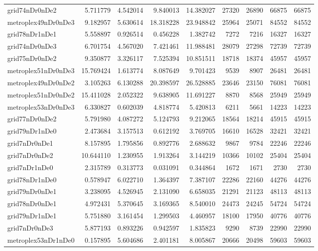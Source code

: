 \begin{longtable}{|l|r|r|r|r|r|r|r|r|}
grid74nDr0nDe2 & 5.711779 & 4.542014 & 9.840013 & 14.382027 & 27320 & 26890 & 66875 & 66875 \\
metroplex49nDr0nDe3 & 9.182957 & 5.630614 & 18.318228 & 23.948842 & 25964 & 25071 & 84552 & 84552 \\
grid78nDr1nDe1 & 5.558897 & 0.926514 & 0.456228 & 1.382742 & 7272 & 7216 & 16327 & 16327 \\
grid74nDr0nDe3 & 6.701754 & 4.567020 & 7.421461 & 11.988481 & 28079 & 27298 & 72739 & 72739 \\
grid75nDr0nDe2 & 9.350877 & 3.326117 & 7.525394 & 10.851511 & 18718 & 18374 & 45957 & 45957 \\
metroplex51nDr0nDe3 & 15.769424 & 1.613774 & 8.087649 & 9.701423 & 9539 & 8907 & 26481 & 26481 \\
metroplex49nDr0nDe2 & 3.105263 & 6.130288 & 20.398597 & 26.528885 & 23646 & 23150 & 76081 & 76081 \\
metroplex51nDr0nDe2 & 15.411028 & 2.052322 & 9.638905 & 11.691227 & 8870 & 8568 & 25949 & 25949 \\
metroplex53nDr0nDe3 & 6.330827 & 0.602039 & 4.818774 & 5.420813 & 6211 & 5661 & 14223 & 14223 \\
grid77nDr0nDe2 & 5.791980 & 4.087272 & 5.124793 & 9.212065 & 18564 & 18214 & 45915 & 45915 \\
grid79nDr1nDe0 & 2.473684 & 3.157513 & 0.612192 & 3.769705 & 16610 & 16528 & 32421 & 32421 \\
grid7nDr0nDe1 & 8.157895 & 1.795856 & 0.892776 & 2.688632 & 9867 & 9784 & 22246 & 22246 \\
grid7nDr0nDe2 & 10.644110 & 1.230955 & 1.913264 & 3.144219 & 10366 & 10102 & 25404 & 25404 \\
grid7nDr1nDe0 & 2.315789 & 0.313773 & 0.031091 & 0.344864 & 1672 & 1671 & 2730 & 2730 \\
grid78nDr1nDe0 & 0.578947 & 6.022710 & 1.364397 & 7.387107 & 22286 & 22160 & 44276 & 44276 \\
grid79nDr0nDe1 & 3.238095 & 4.526945 & 2.131090 & 6.658035 & 21291 & 21123 & 48113 & 48113 \\
grid78nDr0nDe1 & 4.972431 & 5.370645 & 3.169365 & 8.540010 & 24473 & 24245 & 54724 & 54724 \\
grid79nDr1nDe1 & 5.751880 & 3.161454 & 1.299503 & 4.460957 & 18100 & 17950 & 40776 & 40776 \\
grid7nDr0nDe3 & 5.877193 & 0.893226 & 0.942597 & 1.835823 & 9290 & 8739 & 22990 & 22990 \\
metroplex53nDr1nDe0 & 0.157895 & 5.604686 & 2.401181 & 8.005867 & 20666 & 20498 & 59603 & 59603 \\

\end{longtable}
